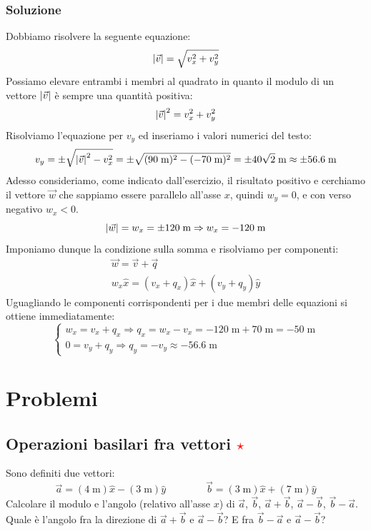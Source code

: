 \documentclass[12pt,a4paper]{book}
\newcommand{\rstar}{ \textcolor{red}{$\star$}}
\begin{document}
\subsubsection*{Soluzione}
Dobbiamo risolvere la seguente equazione:
%
\begin{equation*}
\qty|\vec{v}|=\sqrt{v_x^2+v_y^2}
\end{equation*}
%
Possiamo elevare entrambi i membri al quadrato in quanto il modulo di un vettore $\qty|\vec{v}|$ è sempre una quantità positiva:
%
\begin{equation*}
\qty|\vec{v}|^2=v_x^2+v_y^2
\end{equation*}
%
Risolviamo l'equazione per $v_y$ ed inseriamo i valori numerici del testo:
%
\begin{gather*}
v_y=\pm\sqrt{\qty|\vec{v}|^2-v_x^2}=\pm\sqrt{(90\;\text{m})^2-(-70\;\text{m})^2}=\pm40\sqrt{2}\;\text{m}\approx \pm 56.6\;\text{m}
\end{gather*} 
%
Adesso consideriamo, come indicato dall'esercizio, il risultato positivo e cerchiamo il vettore $\vec{w}$ che sappiamo essere parallelo all'asse $x$, quindi $w_y=0$, e con verso negativo $w_x<0$.
%
\begin{equation*}
\qty|\vec{w}|=w_x=\pm 120\;\text{m} \Rightarrow w_x=-120\;\text{m}
\end{equation*}
%
Imponiamo dunque la condizione sulla somma e risolviamo per componenti:
%
\begin{gather*}
\vec{w}=\vec{v}+\vec{q} \\
w_x\hat{x} = (v_x+q_x)\hat{x} + (v_y+q_y)\hat{y}
\end{gather*} 
%
Uguagliando le componenti corrispondenti per i due membri delle equazioni si ottiene immediatamente: 
%
\[
\begin{cases}
	w_x=v_x+q_x \Rightarrow q_x=w_x-v_x= -120\;\text{m} + 70\;\text{m}=-50\;\text{m} \\
    0=v_y+q_y \Rightarrow q_y=-v_y \approx - 56.6\;\text{m}
\end{cases}
\]
%

\section{Problemi}

\subsection{Operazioni basilari fra vettori \rstar}
Sono definiti due vettori:
%
\begin{equation*}
\vec{a}=(4\;\text{m})\hat{x}-(3\;\text{m})\hat{y} \qquad \qquad \vec{b}=(3\;\text{m})\hat{x}+(7\;\text{m})\hat{y}
\end{equation*}
%
Calcolare il modulo e l'angolo (relativo all'asse $x$) di $\vec{a}$, $\vec{b}$, $\vec{a}+\vec{b}$, $\vec{a}-\vec{b}$, $\vec{b}-\vec{a}$. Quale è l'angolo fra la direzione di $\vec{a}+\vec{b}$ e $\vec{a}-\vec{b}$? E fra $\vec{b}-\vec{a}$ e $\vec{a}-\vec{b}$?
\end{document}
